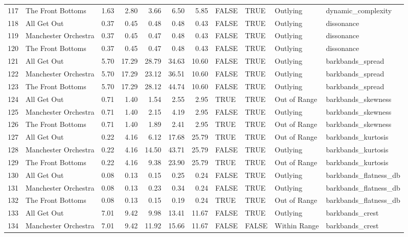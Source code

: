 \begin{table}[ht]
\begin{tabular}{rlrrrrrllll}
  117 & The Front Bottoms & 1.63 & 2.80 & 3.66 & 6.50 & 5.85 & FALSE & TRUE & Outlying & dynamic\_complexity \\ 
  118 & All Get Out & 0.37 & 0.45 & 0.48 & 0.48 & 0.43 & FALSE & TRUE & Outlying & dissonance \\ 
  119 & Manchester Orchestra & 0.37 & 0.45 & 0.47 & 0.48 & 0.43 & FALSE & TRUE & Outlying & dissonance \\ 
  120 & The Front Bottoms & 0.37 & 0.45 & 0.47 & 0.48 & 0.43 & FALSE & TRUE & Outlying & dissonance \\ 
  121 & All Get Out & 5.70 & 17.29 & 28.79 & 34.63 & 10.60 & FALSE & TRUE & Outlying & barkbands\_spread \\ 
  122 & Manchester Orchestra & 5.70 & 17.29 & 23.12 & 36.51 & 10.60 & FALSE & TRUE & Outlying & barkbands\_spread \\ 
  123 & The Front Bottoms & 5.70 & 17.29 & 28.12 & 44.74 & 10.60 & FALSE & TRUE & Outlying & barkbands\_spread \\ 
  124 & All Get Out & 0.71 & 1.40 & 1.54 & 2.55 & 2.95 & TRUE & TRUE & Out of Range & barkbands\_skewness \\ 
  125 & Manchester Orchestra & 0.71 & 1.40 & 2.15 & 4.19 & 2.95 & FALSE & TRUE & Outlying & barkbands\_skewness \\ 
  126 & The Front Bottoms & 0.71 & 1.40 & 1.89 & 2.41 & 2.95 & TRUE & TRUE & Out of Range & barkbands\_skewness \\ 
  127 & All Get Out & 0.22 & 4.16 & 6.12 & 17.68 & 25.79 & TRUE & TRUE & Out of Range & barkbands\_kurtosis \\ 
  128 & Manchester Orchestra & 0.22 & 4.16 & 14.50 & 43.71 & 25.79 & FALSE & TRUE & Outlying & barkbands\_kurtosis \\ 
  129 & The Front Bottoms & 0.22 & 4.16 & 9.38 & 23.90 & 25.79 & TRUE & TRUE & Out of Range & barkbands\_kurtosis \\ 
  130 & All Get Out & 0.08 & 0.13 & 0.15 & 0.25 & 0.24 & FALSE & TRUE & Outlying & barkbands\_flatness\_db \\ 
  131 & Manchester Orchestra & 0.08 & 0.13 & 0.23 & 0.34 & 0.24 & FALSE & TRUE & Outlying & barkbands\_flatness\_db \\ 
  132 & The Front Bottoms & 0.08 & 0.13 & 0.15 & 0.19 & 0.24 & TRUE & TRUE & Out of Range & barkbands\_flatness\_db \\ 
  133 & All Get Out & 7.01 & 9.42 & 9.98 & 13.41 & 11.67 & FALSE & TRUE & Outlying & barkbands\_crest \\ 
  134 & Manchester Orchestra & 7.01 & 9.42 & 11.92 & 15.66 & 11.67 & FALSE & FALSE & Within Range & barkbands\_crest \\ 

\end{tabular}
\end{table}
